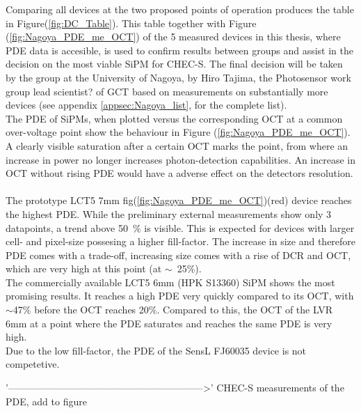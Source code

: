 \documentclass[12pt,article,type=msc,colorback,accentcolor=tud9c]{tudthesis}
\begin{document}
Comparing all devices at the two proposed points of operation produces the table in Figure(\ref{fig:DC_Table}). This table together with Figure (\ref{fig:Nagoya_PDE_me_OCT}) of the 5 measured devices in this thesis, where PDE data is accesible, is used to confirm results between groups and assist in the decision on the most viable SiPM for CHEC-S. The final decision will be taken by the group at the University of Nagoya, by Hiro Tajima, the Photosensor work group lead scientist? of GCT based on measurements on substantially more devices (see appendix \ref{appsec:Nagoya_list}, for the complete list).\\
The PDE of SiPMs, when plotted versus the corresponding OCT at a common over-voltage point show the behaviour in Figure (\ref{fig:Nagoya_PDE_me_OCT}). A clearly visible saturation  after a certain OCT marks the point, from where an increase in power no longer increases photon-detection capabilities. An increase in OCT without rising PDE would have a adverse effect on the detectors resolution.\\\\
The prototype LCT5 7mm fig(\ref{fig:Nagoya_PDE_me_OCT})(red) device reaches the highest PDE. While the preliminary external measurements show only 3 datapoints, a trend above 50~$\%$ is visible. This is expected for devices with larger cell- and pixel-size possesing a higher fill-factor. The increase in size and therefore PDE comes with a trade-off, increasing size comes with a rise of DCR and OCT, which are very high at this point (at $\sim$~25$\%$).\\
The commercially available LCT5 6mm (HPK S13360) SiPM shows the most promising results. It reaches a high PDE very quickly compared to its OCT, with $\sim$47$\%$ before the OCT reaches 20$\%$. Compared to this, the OCT of the LVR 6mm at a point where the PDE saturates and reaches the same PDE is very high.\\
Due to the low fill-factor, the PDE of the SensL FJ60035 device is not competetive.

'------------------------------------------------------------>'
CHEC-S measurements of the PDE, add to figure













\end{document}
